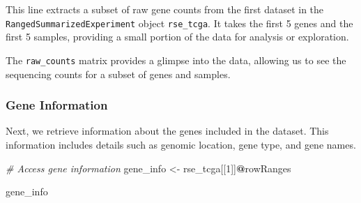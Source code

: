\documentclass[
]{book}
\newenvironment{Shaded}{\begin{snugshade}}{\end{snugshade}}
\newcommand{\CommentTok}[1]{\textcolor[rgb]{0.56,0.35,0.01}{\textit{#1}}}
\newcommand{\DecValTok}[1]{\textcolor[rgb]{0.00,0.00,0.81}{#1}}
\newcommand{\NormalTok}[1]{#1}
\newcommand{\OtherTok}[1]{\textcolor[rgb]{0.56,0.35,0.01}{#1}}
\newcommand{\SpecialCharTok}[1]{\textcolor[rgb]{0.81,0.36,0.00}{\textbf{#1}}}
\begin{document}
This line extracts a subset of raw gene counts from the first dataset in the \texttt{RangedSummarizedExperiment} object \texttt{rse\_tcga}. It takes the first 5 genes and the first 5 samples, providing a small portion of the data for analysis or exploration.

The \texttt{raw\_counts} matrix provides a glimpse into the data, allowing us to see the sequencing counts for a subset of genes and samples.

\hypertarget{gene-information}{%
\subsubsection{Gene Information}\label{gene-information}}

Next, we retrieve information about the genes included in the dataset. This information includes details such as genomic location, gene type, and gene names.

\begin{Shaded}
\begin{Highlighting}[]
\CommentTok{\# Access gene information}
\NormalTok{gene\_info }\OtherTok{\textless{}{-}}\NormalTok{ rse\_tcga[[}\DecValTok{1}\NormalTok{]]}\SpecialCharTok{@}\NormalTok{rowRanges}

\NormalTok{gene\_info}
\end{Highlighting}
\end{Shaded}
\end{document}
